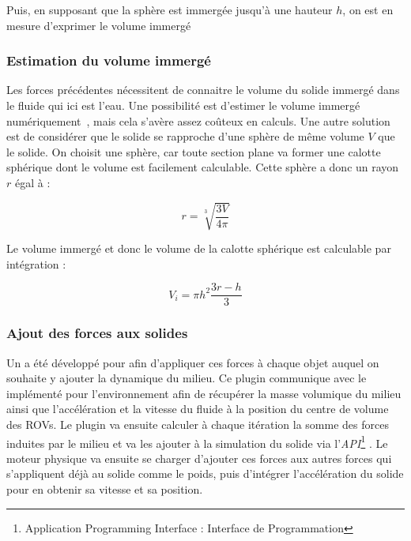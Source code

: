 				Puis, en supposant que la sphère est immergée jusqu'à une hauteur $h$, on est en mesure d'exprimer le volume immergé 

			\subsubsection{Estimation du volume immergé}

				Les forces précédentes nécessitent de connaitre le volume du solide immergé dans le fluide qui ici est l'eau. Une possibilité est d'estimer le volume immergé numériquement~\cite{gilloteaux:tel-00521689}, mais cela s'avère assez coûteux en calculs. Une autre solution est de considérer que le solide se rapproche d'une sphère de même volume $V$ que le solide. On choisit une sphère, car toute section plane va former une calotte sphérique dont le volume est facilement calculable. Cette sphère a donc un rayon $r$ égal à :

				\begin{equation}
					r = \sqrt[3]{\frac{3 V}{4 \pi}}
				\end{equation}

				Le volume immergé et donc le volume de la calotte sphérique est calculable par intégration :

				\begin{equation}
					V_i = \pi h^2\frac{3r-h}{3}
				\end{equation}



			\subsubsection{Ajout des forces aux solides}

				Un \plugin{} a été développé pour \gazebo{} afin d'appliquer ces forces à chaque objet auquel on souhaite y ajouter la dynamique du milieu. Ce plugin communique avec le \plugin{} implémenté pour l'environnement afin de récupérer la masse volumique du milieu ainsi que l'accélération et la vitesse du fluide à la position du centre de volume des \gls{ROV}s. Le plugin va ensuite calculer à chaque itération la somme des forces induites par le milieu et va les ajouter à la simulation du solide via l'\textit{API}\footnote{Application Programming Interface : Interface de Programmation} \gazebo{}. Le moteur physique va ensuite se charger d'ajouter ces forces aux autres forces qui s'appliquent déjà au solide comme le poids, puis d'intégrer l'accélération du solide pour en obtenir sa vitesse et sa position.

